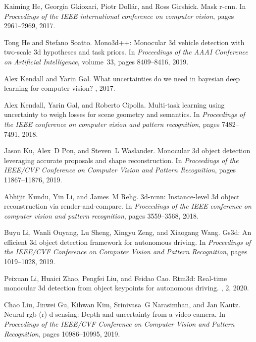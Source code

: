 \documentclass[10pt,twocolumn,letterpaper]{article}
\begin{document}
{\begin{thebibliography}{10}
Kaiming He, Georgia Gkioxari, Piotr Doll{\'a}r, and Ross Girshick.
\newblock Mask r-cnn.
\newblock In {\em Proceedings of the IEEE international conference on computer
  vision}, pages 2961--2969, 2017.

Tong He and Stefano Soatto.
\newblock Mono3d++: Monocular 3d vehicle detection with two-scale 3d hypotheses
  and task priors.
\newblock In {\em Proceedings of the AAAI Conference on Artificial
  Intelligence}, volume~33, pages 8409--8416, 2019.

Alex Kendall and Yarin Gal.
\newblock What uncertainties do we need in bayesian deep learning for computer
  vision?
, 2017.

Alex Kendall, Yarin Gal, and Roberto Cipolla.
\newblock Multi-task learning using uncertainty to weigh losses for scene
  geometry and semantics.
\newblock In {\em Proceedings of the IEEE conference on computer vision and
  pattern recognition}, pages 7482--7491, 2018.

Jason Ku, Alex~D Pon, and Steven~L Waslander.
\newblock Monocular 3d object detection leveraging accurate proposals and shape
  reconstruction.
\newblock In {\em Proceedings of the IEEE/CVF Conference on Computer Vision and
  Pattern Recognition}, pages 11867--11876, 2019.

Abhijit Kundu, Yin Li, and James~M Rehg.
\newblock 3d-rcnn: Instance-level 3d object reconstruction via
  render-and-compare.
\newblock In {\em Proceedings of the IEEE conference on computer vision and
  pattern recognition}, pages 3559--3568, 2018.


Buyu Li, Wanli Ouyang, Lu Sheng, Xingyu Zeng, and Xiaogang Wang.
\newblock Gs3d: An efficient 3d object detection framework for autonomous
  driving.
\newblock In {\em Proceedings of the IEEE/CVF Conference on Computer Vision and
  Pattern Recognition}, pages 1019--1028, 2019.

Peixuan Li, Huaici Zhao, Pengfei Liu, and Feidao Cao.
\newblock Rtm3d: Real-time monocular 3d detection from object keypoints for
  autonomous driving.
, 2, 2020.

Chao Liu, Jinwei Gu, Kihwan Kim, Srinivasa~G Narasimhan, and Jan Kautz.
\newblock Neural rgb (r) d sensing: Depth and uncertainty from a video camera.
\newblock In {\em Proceedings of the IEEE/CVF Conference on Computer Vision and
  Pattern Recognition}, pages 10986--10995, 2019.


\end{thebibliography}}
\end{document}
